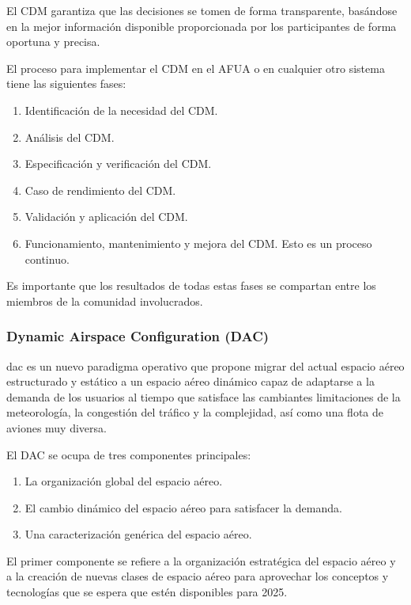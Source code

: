 El CDM garantiza que las decisiones se tomen de forma transparente, basándose en la mejor información disponible proporcionada por los participantes de forma oportuna y precisa.

El proceso para implementar el CDM en el AFUA o en cualquier otro sistema tiene las siguientes fases:

\begin{enumerate}
    \item Identificación de la necesidad del CDM.
    \item Análisis del CDM.
    \item Especificación y verificación del CDM.
    \item Caso de rendimiento del CDM.
    \item Validación y aplicación del CDM.
    \item Funcionamiento, mantenimiento y mejora del CDM. Esto es un proceso continuo.
\end{enumerate}

Es importante que los resultados de todas estas fases se compartan entre los miembros de la comunidad involucrados.

\subsubsection{Dynamic Airspace Configuration (DAC)}

\acrfull{dac} es un nuevo paradigma operativo que propone migrar del actual espacio aéreo estructurado y estático a un espacio aéreo dinámico capaz de adaptarse a la demanda de los usuarios al tiempo que satisface las cambiantes limitaciones de la meteorología, la congestión del tráfico y la complejidad, así como una flota de aviones muy diversa.

El DAC se ocupa de tres componentes principales: 

\begin{enumerate}
    \item La organización global del espacio aéreo.
    \item El cambio dinámico del espacio aéreo para satisfacer la demanda.
    \item Una caracterización genérica del espacio aéreo.
\end{enumerate}

El primer componente se refiere a la organización estratégica del espacio aéreo y a la creación de nuevas clases de espacio aéreo para aprovechar los conceptos y tecnologías que se espera que estén disponibles para 2025. 

